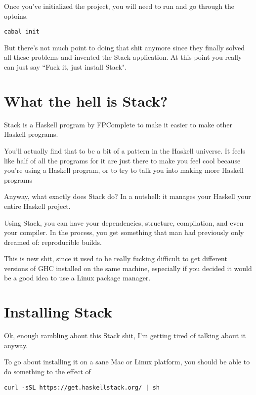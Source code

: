 Once you've initialized the project, you will need to run  and go through the optoins. 

\begin{verbatim}
cabal init

\end{verbatim}



But there's not much point to doing that shit anymore since they finally solved all these problems and invented the Stack application.  At this point you really can just say ``Fuck it, just install Stack". 

\section{What the hell is Stack?}

Stack is a Haskell program by FPComplete to make it easier to make other Haskell programs.  

You'll actually find that to be a bit of a pattern in the Haskell universe.  It feels like half of all the programs for it are just there to make you feel cool because you're using a Haskell program, or to try to talk you into making more Haskell programs

Anyway, what exactly does Stack do?  In a nutshell: it manages your Haskell your entire Haskell project.  

Using Stack, you can have your dependencies, structure, compilation, and even your compiler.  In the process, you get something that man had previously only dreamed of: reproducible builds. 

This is new shit, since it used to be really fucking difficult to get different versions of GHC installed on the same machine, especially if you decided it would be a good idea to use a Linux package manager. 

\section {Installing Stack}

Ok, enough rambling about this Stack shit, I'm getting tired of talking about it anyway.  

To go about installing it on a sane Mac or Linux platform, you should be able to do something to the effect of 

\begin{verbatim}
curl -sSL https://get.haskellstack.org/ | sh
\end{verbatim}

